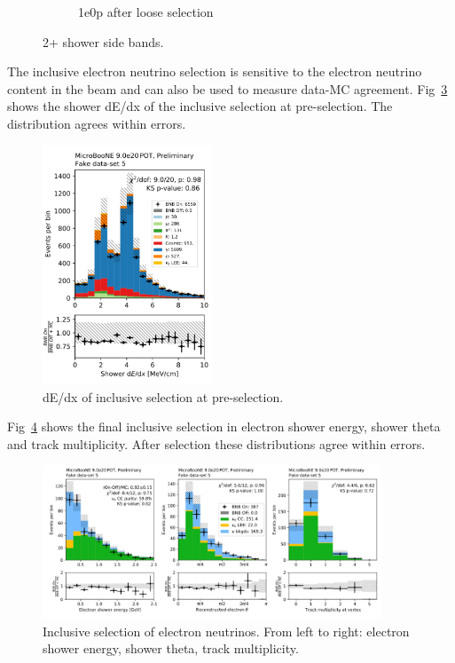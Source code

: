 \begin{figure}[H]
\begin{center}
\begin{subfigure}[b]{0.45\textwidth}
    \caption{\label{fig:fakedata:set5:2shr0p} 1e0p after loose selection}
    \end{subfigure}
\caption{\label{fig:fakedata:set5:2shr} 2+ shower side bands.}
\end{center}
\end{figure}

The inclusive electron neutrino selection is sensitive to the electron neutrino content in the beam and can also be used to measure data-MC agreement.  Fig~\ref{fig:fakedata:set5:inc_presel} shows the shower dE/dx of the inclusive selection at pre-selection.  The distribution agrees within errors.   

\begin{figure}[H]
\begin{center}
\includegraphics[width=0.45\textwidth]{Fakedata/set5/inc_presel.pdf}
\caption{\label{fig:fakedata:set5:inc_presel} dE/dx of inclusive selection at pre-selection.}
\end{center}
\end{figure}

Fig~\ref{fig:fakedata:set5:inc_postsel} shows the final inclusive selection in electron shower energy, shower theta and track multiplicity.  After selection these distributions agree within errors.

\begin{figure}[H]
\begin{center}
\includegraphics[width=0.9\textwidth]{Fakedata/set5/incl_postsel.pdf}
\caption{\label{fig:fakedata:set5:inc_postsel} Inclusive selection of electron neutrinos. From left to right: electron shower energy, shower theta, track multiplicity.}
\end{center}
\end{figure}

